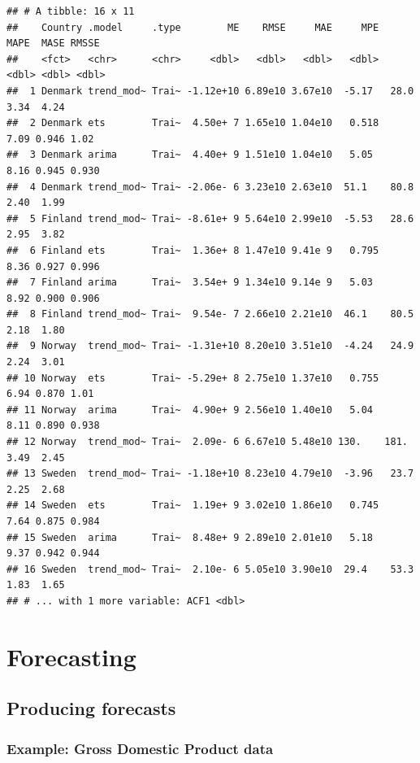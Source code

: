 \documentclass[
]{book}
\begin{document}
\begin{verbatim}
## # A tibble: 16 x 11
##    Country .model     .type        ME    RMSE     MAE     MPE   MAPE  MASE RMSSE
##    <fct>   <chr>      <chr>     <dbl>   <dbl>   <dbl>   <dbl>  <dbl> <dbl> <dbl>
##  1 Denmark trend_mod~ Trai~ -1.12e+10 6.89e10 3.67e10  -5.17   28.0  3.34  4.24 
##  2 Denmark ets        Trai~  4.50e+ 7 1.65e10 1.04e10   0.518   7.09 0.946 1.02 
##  3 Denmark arima      Trai~  4.40e+ 9 1.51e10 1.04e10   5.05    8.16 0.945 0.930
##  4 Denmark trend_mod~ Trai~ -2.06e- 6 3.23e10 2.63e10  51.1    80.8  2.40  1.99 
##  5 Finland trend_mod~ Trai~ -8.61e+ 9 5.64e10 2.99e10  -5.53   28.6  2.95  3.82 
##  6 Finland ets        Trai~  1.36e+ 8 1.47e10 9.41e 9   0.795   8.36 0.927 0.996
##  7 Finland arima      Trai~  3.54e+ 9 1.34e10 9.14e 9   5.03    8.92 0.900 0.906
##  8 Finland trend_mod~ Trai~  9.54e- 7 2.66e10 2.21e10  46.1    80.5  2.18  1.80 
##  9 Norway  trend_mod~ Trai~ -1.31e+10 8.20e10 3.51e10  -4.24   24.9  2.24  3.01 
## 10 Norway  ets        Trai~ -5.29e+ 8 2.75e10 1.37e10   0.755   6.94 0.870 1.01 
## 11 Norway  arima      Trai~  4.90e+ 9 2.56e10 1.40e10   5.04    8.11 0.890 0.938
## 12 Norway  trend_mod~ Trai~  2.09e- 6 6.67e10 5.48e10 130.    181.   3.49  2.45 
## 13 Sweden  trend_mod~ Trai~ -1.18e+10 8.23e10 4.79e10  -3.96   23.7  2.25  2.68 
## 14 Sweden  ets        Trai~  1.19e+ 9 3.02e10 1.86e10   0.745   7.64 0.875 0.984
## 15 Sweden  arima      Trai~  8.48e+ 9 2.89e10 2.01e10   5.18    9.37 0.942 0.944
## 16 Sweden  trend_mod~ Trai~  2.10e- 6 5.05e10 3.90e10  29.4    53.3  1.83  1.65 
## # ... with 1 more variable: ACF1 <dbl>
\end{verbatim}

\hypertarget{part-forecasting}{%
\part{Forecasting}\label{part-forecasting}}

\hypertarget{producing-forecasts-1}{%
\chapter{Producing forecasts}\label{producing-forecasts-1}}

\hypertarget{example-gross-domestic-product-data-1}{%
\section{Example: Gross Domestic Product data}\label{example-gross-domestic-product-data-1}}
\end{document}
